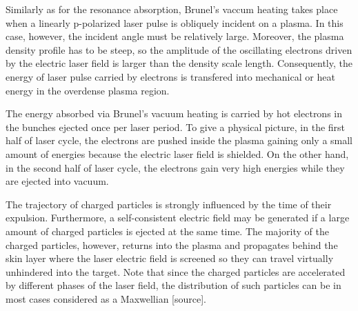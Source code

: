Similarly as for the resonance absorption, Brunel's vaccum heating takes place when a linearly p-polarized laser pulse is obliquely incident on a plasma. In this case, however, the incident angle must be relatively large. Moreover, the plasma density profile has to be steep, so the amplitude of the oscillating electrons driven by the electric laser field is larger than the density scale length. Consequently, the energy of laser pulse carried by electrons is transfered into mechanical or heat energy in the overdense plasma region.

The energy absorbed via Brunel's vacuum heating is carried by hot electrons in the bunches
ejected once per laser period. To give a physical picture, in the first half of laser cycle, the electrons are pushed inside the plasma gaining only a small amount of energies because the electric laser field is shielded. On the other hand, in the second half of laser cycle, the electrons gain very high energies while they are ejected into vacuum. 

The trajectory of charged particles is strongly influenced by the time of their expulsion. Furthermore, a self-consistent electric field may be generated if a large amount of charged particles is ejected at the same time. The majority of the charged particles, however, returns into the plasma and propagates behind the skin layer where the laser electric field is screened so they can travel virtually unhindered into the target. Note that since the charged particles are accelerated by different phases of the laser field, the distribution of such particles can be in most cases considered as a Maxwellian [source].